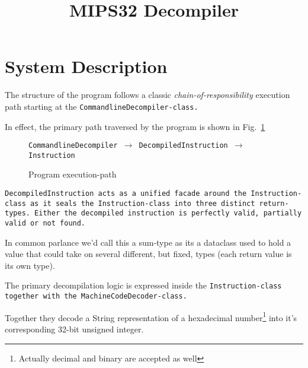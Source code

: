 
\newcommand{\titlename}{MIPS32 Decompiler}
\title{\titlename}





\tableofcontents
\clearpage



%
% 
% 
% 
% 
% 
% 
%




\section{System Description}

The structure of the program follows a classic
\emph{chain-of-responsibility} execution path starting at the
\tt{CommandlineDecompiler}-class.

In effect, the primary path traversed by the program is shown in
Fig.~\ref{fig:execution-path}

\begin{figure}
\tt{CommandlineDecompiler} $\rightarrow$ \tt{DecompiledInstruction} $\rightarrow$ \tt{Instruction}
\caption{Program execution-path}
\label{fig:execution-path}
\end{figure}

\tt{DecompiledInstruction} acts as a unified facade around the
Instruction-class as it seals the \tt{Instruction}-class into three
distinct return-types. Either the decompiled instruction is perfectly
valid, partially valid or not found.

In common parlance we'd call this a sum-type as its a dataclass used
to hold a value that could take on several different, but fixed, types
(each return value is its own type).\cite{Wikipedia:Tagged-union}

The primary decompilation logic is expressed inside the
\tt{Instruction}-class together with the
\tt{MachineCodeDecoder}-class.

Together they decode a String representation of a hexadecimal
number\footnote{Actually decimal and binary are accepted as well} into
it's corresponding 32-bit unsigned integer.

